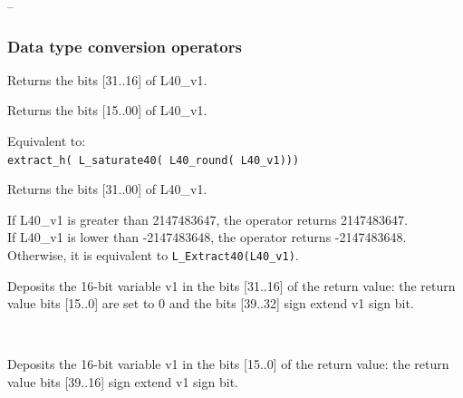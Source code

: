  -- 

\subsubsection{Data type conversion operators}


Returns the bits [31..16] of L40\_v1.


Returns the bits [15..00] of L40\_v1.


Equivalent to:\\
{\tt extract\_h( L\_saturate40( L40\_round( L40\_v1))) }


Returns the bits [31..00] of L40\_v1.


If L40\_v1 is greater than 2147483647, the operator returns 2147483647. \\
If L40\_v1 is lower than -2147483648, the operator returns -2147483648. \\
Otherwise, it is equivalent to {\tt L\_Extract40(L40\_v1)}.



Deposits the 16-bit variable v1 in the bits [31..16] of the return value: the return value bits [15..0] are set to 0 and the bits [39..32] sign extend v1 sign bit.

\ \\

Deposits the 16-bit variable v1 in the bits [15..0] of the return value: the return value bits [39..16] sign extend v1 sign bit.


